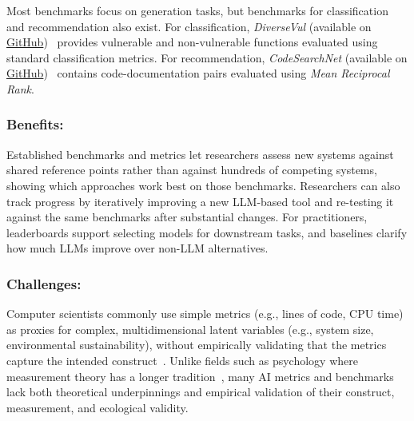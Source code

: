 \documentclass[smallextended]{svjour3}
\newcommand{\guidelinesubsubsection}[1]{\subsubsection{\bfseries #1:}}
\newcommand{\guidelinesubsubsection}[1]{\subsubsection{#1}}
\begin{document}
Most benchmarks focus on generation tasks, but benchmarks for classification and recommendation also exist.
For classification, \emph{DiverseVul} (available on \href{https://github.com/wagner-group/diversevul}{GitHub})~\cite{DBLP:conf/raid/0001DACW23} provides vulnerable and non-vulnerable functions evaluated using standard classification metrics.
For recommendation, \emph{CodeSearchNet} (available on \href{https://github.com/github/CodeSearchNet}{GitHub})~\cite{DBLP:journals/corr/abs-1909-09436} contains code-documentation pairs evaluated using \emph{Mean Reciprocal Rank}.

\guidelinesubsubsection{Benefits}

Established benchmarks and metrics let researchers assess new systems against shared reference points rather than against hundreds of competing systems, showing which approaches work best on those benchmarks. Researchers can also track progress by iteratively improving a new LLM-based tool and re-testing it against the same benchmarks after substantial changes. For practitioners, leaderboards support selecting models for downstream tasks, and baselines clarify how much LLMs improve over non-LLM alternatives.

\guidelinesubsubsection{Challenges}

Computer scientists commonly use simple metrics (e.g., lines of code, CPU time) as proxies for complex, multidimensional latent variables (e.g., system size, environmental sustainability), without empirically validating that the metrics capture the intended construct~\cite{DBLP:conf/ease/RalphT18}. Unlike fields such as psychology where measurement theory has a longer tradition~\cite{borsboom2005measuring}, many AI metrics and benchmarks lack both theoretical underpinnings and empirical validation of their construct, measurement, and ecological validity.
\end{document}
